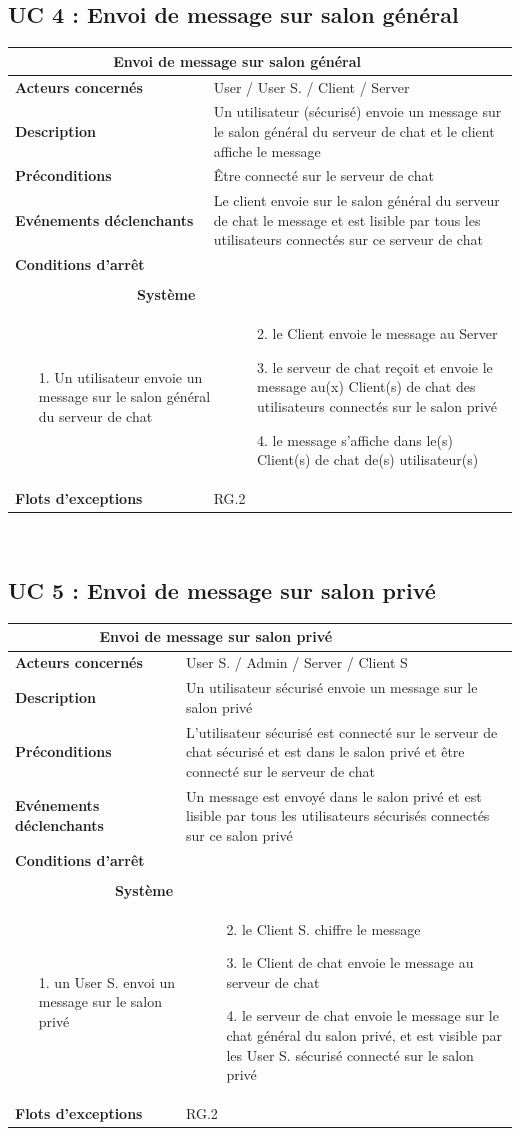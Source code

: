 \documentclass[a4paper,11pt,french]{article}
\newcommand{\fiche}[9] {
	\noindent
\begin{tabular}{|p{3.5cm}| p{1cm} | p{3cm} | p{.5cm} | p{7cm}|} 
\hline
\rowcolor{blue}
\multicolumn{2}{|l|}{\color{white}\bfseries{Nom}} & \multicolumn{3}{l|}{\color{white}\bfseries{#1}}\\
\hline
\multicolumn{2}{|l|}{\bfseries{Acteurs concernés}} & \multicolumn{3}{m{10.5cm}|}{#2}\\
\hline
\multicolumn{2}{|l|}{\bfseries{Description}} & \multicolumn{3}{m{10.5cm}|}{#3}\\
\hline
\multicolumn{2}{|l|}{\bfseries{Préconditions}} & \multicolumn{3}{m{10.5cm}|}{#4}\\
\hline
\multicolumn{2}{|l|}{\bfseries{Evénements déclenchants}} & \multicolumn{3}{m{10.5cm}|}{#5}\\
\hline
\multicolumn{2}{|l|}{\bfseries{Conditions d'arrêt}} & \multicolumn{3}{m{10.5cm}|}{#6}\\
\hline
\rowcolor{gray}
\multicolumn{5}{|c|}{\bfseries{Description du flot d'événements principal}}\\
\hline
\rowcolor{gray}
\multicolumn{3}{|c|}{\bfseries{Acteur(s)}} & \multicolumn{2}{c|}{\bfseries{Système}}\\
\hline
\multicolumn{3}{|p{7.5cm}|}{#7} & \multicolumn{2}{p{7.5cm}|}{#8}\\
\hline
\multicolumn{2}{|l}{\bfseries{Flots d'exceptions}} & \multicolumn{3}{|p{11.5cm}|}{#9}\\
\hline
\end{tabular}
\\
}
\begin{document}
\subsection{UC 4 : Envoi de message sur salon général}

\fiche
	{Envoi de message sur salon général} %
	{User / User S. / Client / Server} %
	{Un utilisateur (sécurisé) envoie un message sur le salon général du serveur de chat et le client affiche le message} %
	{Être connecté sur le serveur de chat } %
	{Le client envoie sur le salon général du serveur de chat le message  et est lisible par tous les utilisateurs connectés sur ce serveur de chat} %
	{} %
	{\begin{itemize}  %
		\item [1.] Un utilisateur envoie un message sur le salon général du serveur de chat
	 \end{itemize}
	} 
	{\begin{itemize}  %
		\item []
		\item [2.] le Client envoie le message au Server
		\item [3.] le serveur de chat reçoit et envoie le message au(x) Client(s) de chat des utilisateurs connectés sur le salon privé
		\item [4.] le message s’affiche dans le(s) Client(s) de chat de(s) utilisateur(s)
	 \end{itemize}
	 }
	{RG.2} %

\subsection{UC 5 : Envoi de message sur salon privé}

\fiche
	{Envoi de message sur salon privé} %
	{User S. / Admin / Server / Client S} %
	{Un utilisateur sécurisé envoie un message sur le salon privé} %
	{L’utilisateur sécurisé est connecté sur le serveur de chat sécurisé et est dans le salon privé et être connecté sur le serveur de chat} %
	{Un message est envoyé dans le salon privé et est lisible par tous les utilisateurs sécurisés connectés sur ce salon privé} %
	{} %
	{\begin{itemize}  %
		\item [1.] un User S. envoi un message sur le salon privé
	 \end{itemize}
	} 
	{\begin{itemize}  %
		\item []
		\item [2.] le Client S. chiffre le message
		\item [3.] le Client de chat envoie le message au serveur de chat
		\item [4.] le serveur de chat envoie le message sur le chat général du salon privé, et est visible par les User S. sécurisé connecté sur le salon privé
	 \end{itemize}
	 }
	{RG.2} %
\end{document}
